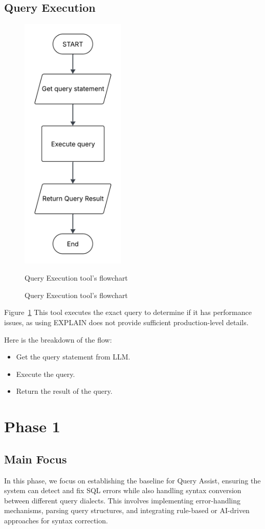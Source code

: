     \subsection{Query Execution}
    \label{sec:query_execution}
    \begin{figure}[H]
      \centering
      \includegraphics[width=5cm]{chapters/3/figures/query_execution.png}
      \caption{Query Execution tool's flowchart}{Query Execution tool's flowchart}
        \label{fig:query_execution}
    \end{figure}
    Figure~\ref{fig:query_execution} This tool executes the exact query to determine if it has performance issues, as using EXPLAIN does not provide sufficient production-level details.

    Here is the breakdown of the flow:
    \begin{itemize}
      \item Get the query statement from LLM.
      \item Execute the query.
      \item Return the result of the query.
    \end{itemize}
\pagebreak
\section{Phase 1}
    \subsection{Main Focus}
    In this phase, we focus on establishing the baseline for Query Assist, ensuring the system can detect and fix SQL errors while also handling syntax conversion between different query dialects. This involves implementing error-handling mechanisms, parsing query structures, and integrating rule-based or AI-driven approaches for syntax correction.

